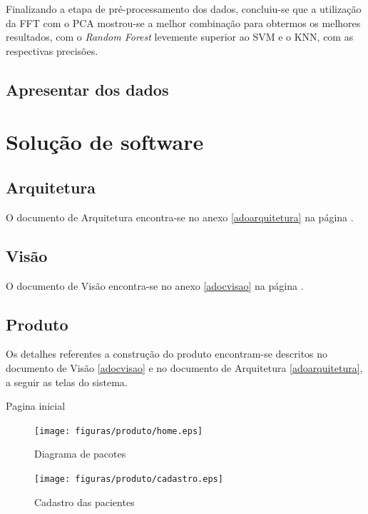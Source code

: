 Finalizando a etapa de pré-processamento dos dados, concluiu-se que a utilização da FFT com o PCA mostrou-se a melhor combinação para obtermos os melhores resultados, com o \textit{Random Forest} levemente superior ao SVM e o KNN, com as respectivas precisões.

\subsection{Apresentar dos dados}

\section{Solução de software}
\subsection{Arquitetura}
O documento de Arquitetura encontra-se no anexo \ref{adoarquitetura} na página \pageref{adoarquitetura}.

\subsection{Visão}
O documento de Visão encontra-se no anexo \ref{adocvisao} na página \pageref{adocvisao}.

\subsection{Produto}
Os detalhes referentes a construção do produto encontram-se descritos no documento de Visão \ref{adocvisao} e no documento de Arquitetura \ref{adoarquitetura}, a seguir as telas do sistema.

Pagina inicial

\begin{figure}[!htb]
    \centering
    \texttt{[image: figuras/produto/home.eps]}
    \caption{Diagrama de pacotes}
    \label{fighome}
\end{figure}

\begin{figure}[!htb]
    \centering
    \texttt{[image: figuras/produto/cadastro.eps]}
    \caption{Cadastro das pacientes}
    \label{figcadastro}
\end{figure}


